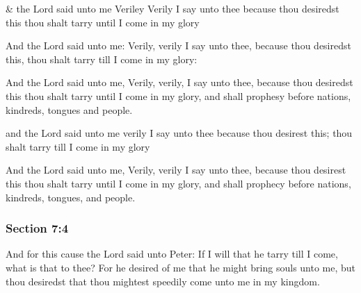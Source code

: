 		\begin{framed}
		\scriptsize
			\begin{compactdesc}
				\item[JSP] \& the Lord said unto me Veriley Verily I say unto thee because thou desiredst this thou shalt tarry until I come in my glory
				\item[BC] And the Lord said unto me: Verily, verily I say unto thee, because thou desiredst this, thou shalt tarry till I come in my glory:
				\item[DC 1835] And the Lord said unto me, Verily, verily, I say unto thee, because thou desiredst this thou shalt tarry until I come in my glory, and shall prophesy before nations, kindreds, tongues and people.
				\item[FGW] and the Lord said unto me verily I say unto thee because thou desirest this; thou shalt tarry till I come in my glory
				\item[DC 1844] And the Lord said unto me, Verily, verily I say unto thee, because thou desirest this thou shalt tarry until I come in my glory, and shall prophecy before nations, kindreds, tongues, and people.
			\end{compactdesc}
		\end{framed}

	\subsubsection{Section 7:4} %
		\label{DC7-4}

		And for this cause the Lord said unto Peter: If I will that he tarry till I come, what is that to thee?  For he desired of me that he might bring souls unto me, but thou desiredst that thou mightest speedily come unto me in my kingdom.

